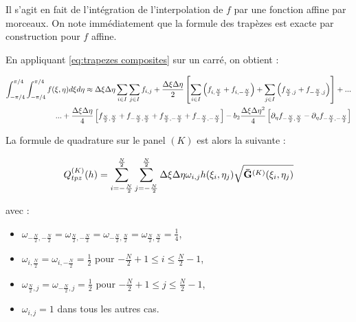 Il s'agit en fait de l'intégration de l'interpolation de $f$ par une fonction affine par morceaux. On note immédiatement que la formule des trapèzes est exacte par construction pour $f$ affine.

En appliquant \eqref{eq:trapezes composites} sur un carré, on obtient :

\begin{equation}
\begin{split}
\displaystyle\int_{-\pi/4}^{\pi/4} \displaystyle\int_{-\pi/4}^{\pi/4} f(\xi,\eta)d\xi d\eta \approx \Delta \xi \Delta \eta \displaystyle\sum\limits_{i \in I} \displaystyle\sum\limits_{j \in I} f_{i,j} +  \dfrac{\Delta \xi \Delta \eta}{2} \left[ \displaystyle\sum\limits_{i \in I} \left(  f_{i,\frac{N}{2}} + f_{i,-\frac{N}{2}}  \right) + \displaystyle\sum\limits_{j \in I} \left(  f_{\frac{N}{2},j} + f_{-\frac{N}{2},j}  \right) \right] + ... \\
...+ \dfrac{\Delta \xi \Delta \eta}{4} \left[ f_{\frac{N}{2},\frac{N}{2}}+f_{-\frac{N}{2},\frac{N}{2}}+f_{\frac{N}{2},-\frac{N}{2}}+f_{-\frac{N}{2},-\frac{N}{2}} \right]- b_2 \dfrac{\Delta \xi \Delta \eta^2}{4} \left[ \partial_{\eta} f_{-\frac{N}{2},\frac{N}{2}} - \partial_{\eta} f_{-\frac{N}{2},-\frac{N}{2}} \right]
\end{split}
\label{eq:trapezes 2d composite}
\end{equation}

La formule de quadrature sur le panel $(K)$ est alors la suivante :

\begin{equation}
Q_{tpz}^{(K)}(h)=\displaystyle\sum\limits_{i = -\frac{N}{2}}^{\frac{N}{2}}\displaystyle\sum\limits_{j = -\frac{N}{2}}^{\frac{N}{2}} \Delta \xi \Delta \eta \omega_{i,j} h(\xi_i, \eta_j) \sqrt{\mathbf{\bar{G}}^{(K)}(\xi_i, \eta_j)}
\label{eq:trapezes par panel}
\end{equation}

avec :

\begin{itemize}
\item $\omega_{-\frac{N}{2},-\frac{N}{2}}=\omega_{\frac{N}{2},-\frac{N}{2}}=\omega_{-\frac{N}{2},\frac{N}{2}}=\omega_{\frac{N}{2},\frac{N}{2}}=\frac{1}{4}$,
\item $\omega_{i,\frac{N}{2}}=\omega_{i,-\frac{N}{2}}=\frac{1}{2}$ pour $-\frac{N}{2}+1 \leq i \leq \frac{N}{2}-1$,
\item $\omega_{\frac{N}{2},j}=\omega_{-\frac{N}{2},j}=\frac{1}{2}$ pour $-\frac{N}{2}+1 \leq j \leq \frac{N}{2}-1$,
\item $\omega_{i,j}=1$ dans tous les autres cas.
\end{itemize}

